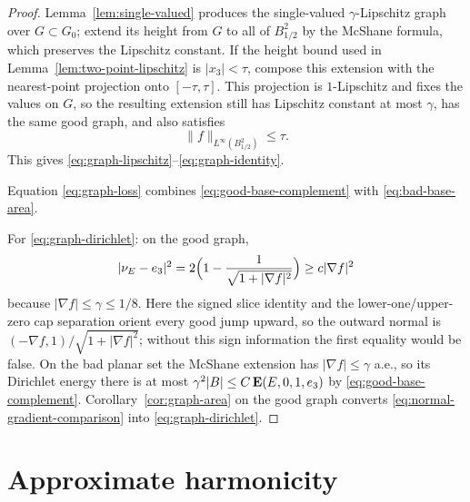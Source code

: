\begin{proof}
Lemma~\ref{lem:single-valued} produces the single-valued
$\gamma$-Lipschitz graph over $G\subset G_0$; extend its height from $G$ to all
of $B^2_{1/2}$ by the McShane formula, which preserves the Lipschitz constant.
If the height bound used in Lemma~\ref{lem:two-point-lipschitz} is
$|x_3|<\tau$, compose this extension with the nearest-point projection onto
$[-\tau,\tau]$.  This projection is $1$-Lipschitz and fixes the values on
$G$, so the resulting extension still has Lipschitz constant at most
$\gamma$, has the same good graph, and also satisfies
\begin{equation}\label{eq:graph-extension-height}
 \|f\|_{L^\infty(B^2_{1/2})}\le\tau.
\end{equation}
This gives \eqref{eq:graph-lipschitz}--\eqref{eq:graph-identity}.

Equation \eqref{eq:graph-loss} combines
\eqref{eq:good-base-complement} with \eqref{eq:bad-base-area}.

For \eqref{eq:graph-dirichlet}: on the good graph,
\begin{equation}\label{eq:normal-gradient-comparison}
  |\nu_E-e_3|^2=2\Bigl(1-\frac1{\sqrt{1+|\nabla f|^2}}\Bigr)\ge c|\nabla f|^2
\end{equation}
because $|\nabla f|\le\gamma\le1/8$.  Here the signed slice identity and the
lower-one/upper-zero cap separation orient every good jump upward, so the
outward normal is $(-\nabla f,1)/\sqrt{1+|\nabla f|^2}$; without this sign
information the first equality would be false.  On the bad planar set the McShane
extension has $|\nabla f|\le\gamma$ a.e., so its Dirichlet energy there is at
most $\gamma^2|B|\le C\operatorname{\mathbf E}(E,0,1,e_3)$ by \eqref{eq:good-base-complement}.
Corollary~\ref{cor:graph-area} on the good graph converts
\eqref{eq:normal-gradient-comparison} into
\eqref{eq:graph-dirichlet}.
\end{proof}

\section{Approximate harmonicity}

